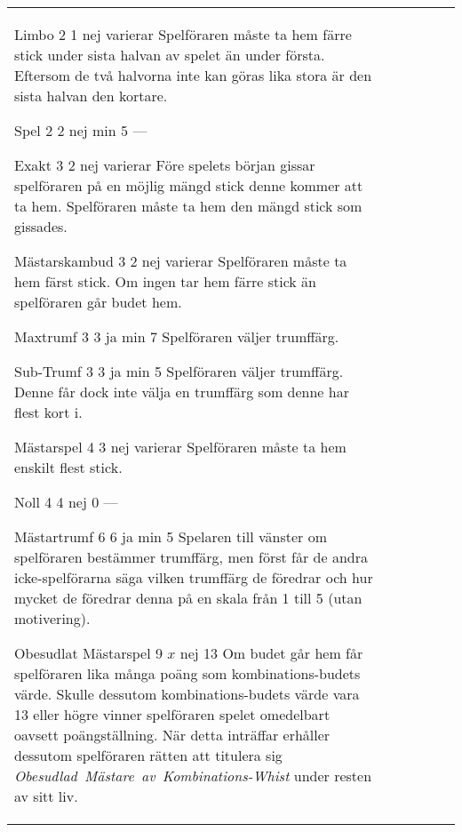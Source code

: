 \begin{table}
\begin{center}
\begin{tabularx}{\textwidth}{
			l
			S[table-number-alignment=center, table-format=1.0]
			S[table-number-alignment=center, table-format=1.0]
			cc|X
		}
				\standardBidItem%
				{Limbo}
				{2}
				{1}
				{nej}
				{varierar}
				{%
					Spelföraren måste ta hem färre stick under sista halvan av spelet än under första. Eftersom de två halvorna inte kan göras lika stora är den sista halvan den kortare.
				}
				
				\standardBidItem%
				{Spel}
				{2}
				{2}
				{nej}
				{min 5}
				{%
					---
				}

				\standardBidItem%
				{Exakt}
				{3}
				{2}
				{nej}
				{varierar}
				{%
					Före spelets början gissar spelföraren på en möjlig mängd stick denne kommer att ta hem. Spelföraren måste ta hem den mängd stick som gissades.
				}

				\standardBidItem%
				{Mästarskambud}
				{3}
				{2}
				{nej}
				{varierar}
				{%
					Spelföraren måste ta hem färst stick. Om ingen tar hem färre stick än spelföraren går budet hem.
				}

				\standardBidItem%
				{Maxtrumf}
				{3}
				{3}
				{ja}
				{min 7}
				{%
					Spelföraren väljer trumffärg.
				}

				\standardBidItem%
				{Sub-Trumf}
				{3}
				{3}
				{ja}
				{min 5}
				{%
					Spelföraren väljer trumffärg. Denne får dock inte välja en trumffärg som denne har flest kort i.
				}

				\standardBidItem%
				{Mästarspel}
				{4}
				{3}
				{nej}
				{varierar}
				{%
					Spelföraren måste ta hem enskilt flest stick.
				}

				\standardBidItem%
				{Noll}
				{4}
				{4}
				{nej}
				{0}
				{%
					---
				}

				\standardBidItem%
				{Mästartrumf}
				{6}
				{6}
				{ja}
				{min 5}
				{%
					Spelaren till vänster om spelföraren bestämmer trumffärg, men först får de andra icke-spelförarna säga vilken trumffärg de föredrar och hur mycket de föredrar denna på en skala från 1 till 5 (utan motivering).
				}

				\standardBidItem%
				{Obesudlat Mästarspel}
				{9}
				{$x$}
				{nej}
				{13}
				{%
					Om budet går hem får spelföraren lika många poäng som kombinations-budets värde. Skulle dessutom kombinations-budets värde vara 13 eller högre vinner spelföraren spelet omedelbart oavsett poängställning. När detta inträffar erhåller dessutom spelföraren rätten att titulera sig \emph{Obesudlad~Mästare~av~Kombinations-Whist} under resten av sitt liv.
				}
		\end{tabularx}
	\end{center}
\end{table}
